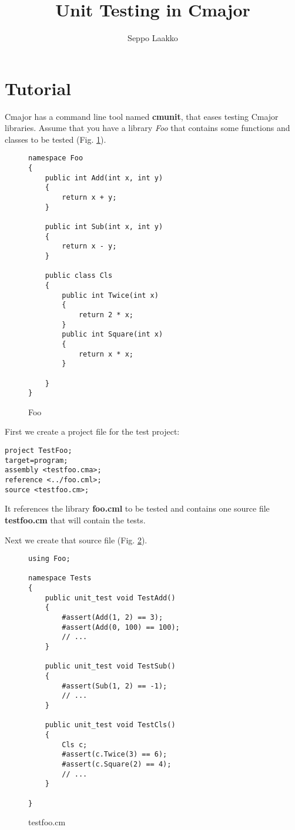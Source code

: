\documentclass[oneside, a4paper, 11pt]{article}
\begin{document}
\title{Unit Testing in Cmajor}
\author{Seppo Laakko}
\maketitle

\section{Tutorial}

Cmajor has a command line tool named \textbf{cmunit}, that
eases testing Cmajor libraries.
Assume that you have a library \emph{Foo} that contains some
functions and classes to be tested (Fig. \ref{fig:foo}).

\begin{figure}[htb]\caption{Foo}\label{fig:foo}
\begin{lstlisting}[frame=trBL]
namespace Foo
{
    public int Add(int x, int y)
    {
        return x + y;
    }

    public int Sub(int x, int y)
    {
        return x - y;
    }

    public class Cls
    {
        public int Twice(int x)
        {
            return 2 * x;
        }
        public int Square(int x)
        {
            return x * x;
        }

    }
}
\end{lstlisting}
\end{figure}

\clearpage
First we create a project file for the test project:

\begin{verbatim}
project TestFoo;
target=program;
assembly <testfoo.cma>;
reference <../foo.cml>;
source <testfoo.cm>;
\end{verbatim}

It references the library \textbf{foo.cml} to be tested and
contains one source file \textbf{testfoo.cm} that will contain the
tests.

Next we create that source file (Fig. \ref{fig:testfoo}).

\begin{figure}[htb]\caption{testfoo.cm}\label{fig:testfoo}
\begin{lstlisting}[frame=trBL]
using Foo;

namespace Tests
{
    public unit_test void TestAdd()
    {
        #assert(Add(1, 2) == 3);
        #assert(Add(0, 100) == 100);
        // ...
    }

    public unit_test void TestSub()
    {
        #assert(Sub(1, 2) == -1);
        // ...
    }

    public unit_test void TestCls()
    {
        Cls c;
        #assert(c.Twice(3) == 6);
        #assert(c.Square(2) == 4);
        // ...
    }

}
\end{lstlisting}
\end{figure}
\end{document}
